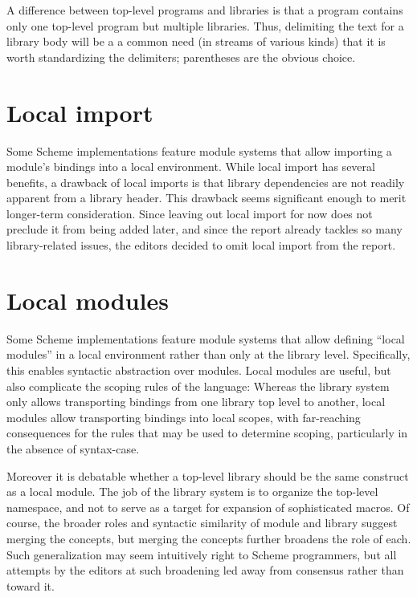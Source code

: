 \documentclass[twoside,twocolumn]{algol60}
\begin{document}
A difference between top-level programs and libraries is that a
program contains only one top-level program but multiple libraries.
Thus, delimiting the text for a library body will be a
a common need (in streams of various kinds) that it is worth
standardizing the delimiters; parentheses are the obvious choice.

\section{Local import}

Some Scheme implementations feature module systems that allow
importing a module's bindings into a local environment.  While local
import has several benefits, a drawback of local
imports is that library dependencies are not readily apparent from a
library header. This drawback seems significant enough to merit
longer-term consideration. Since leaving out local import for now does
not preclude it from being added later, and since the report already
tackles so many library-related issues, the editors decided to omit
local import from the report.

\section{Local modules}

Some Scheme implementations feature module systems that allow defining
``local modules'' in a local environment rather than only at the
library level.  Specifically, this enables syntactic abstraction over
modules.  Local modules are useful, but also complicate
the scoping rules of the language: Whereas the library system only
allows transporting bindings from one library top level to another,
local modules allow transporting bindings into local scopes, with
far-reaching consequences for the rules that may be used to determine
scoping, particularly in the absence of {\cf syntax-case}.

Moreover it is debatable whether a top-level library should
be the same construct as a local module. The job of the library
system is to organize the top-level namespace, and not to serve as a
target for expansion of sophisticated macros. Of course, the broader
roles and syntactic similarity of {\cf module} and {\cf library}
suggest merging the concepts, but merging the concepts further
broadens the role of each.  Such generalization may seem intuitively
right to Scheme programmers, but all attempts by the editors at such
broadening led away from consensus rather than toward it.
\end{document}
